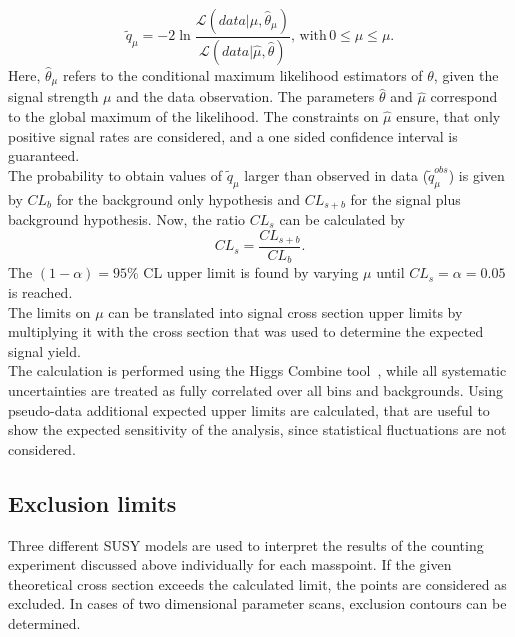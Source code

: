\begin{equation}
 \tilde{q}_{\mu}= -2 \ln \frac{\mathcal{L}(data|\mu,\hat{\theta}_{\mu})}{\mathcal{L}(data|\hat{\mu},\hat{\theta})}, \,\mathrm{with}\,0\leq\hat{\mu}\leq\mu.
\end{equation}
Here, $\hat{\theta}_{\mu}$ refers to the conditional maximum likelihood estimators of $\theta$, given the signal strength $\mu$ and the data observation. The parameters $\hat{\theta}$ and $\hat{\mu}$ correspond to the global maximum of the likelihood. The constraints on $\hat{\mu}$ ensure, that only positive signal rates are considered, and a one sided confidence interval is guaranteed.\\
The probability to obtain values of $\tilde{q}_{\mu}$ larger than observed in data ($\tilde{q}_{\mu}^{obs}$) is given by $CL_b$ for the background only hypothesis and $CL_{s+b}$ for the signal plus background hypothesis. Now, the ratio $CL_s$ can be calculated by
\begin{equation}
 CL_s=\frac{CL_{s+b}}{CL_b}.
\end{equation}
The $(1-\alpha)=95\%$ CL upper limit is found by varying $\mu$ until $CL_s = \alpha=0.05$ is reached.\\
The limits on $\mu$ can be translated into signal cross section upper limits by multiplying it with the cross section that was used to determine the expected signal yield.\\
The calculation is performed using the Higgs Combine tool~\cite{CLS3}, while all systematic uncertainties are treated as fully correlated over all bins and backgrounds.
Using pseudo-data additional expected upper limits are calculated, that are useful to show the expected sensitivity of the analysis, since statistical fluctuations are not considered.

\newpage
\subsection{Exclusion limits}
Three different SUSY models are used to interpret the results of the counting experiment discussed above individually for each masspoint. If the given theoretical cross section exceeds the calculated limit, the points are considered as excluded. In cases of two dimensional parameter scans, exclusion contours can be determined.


